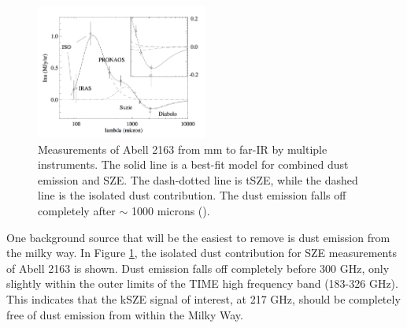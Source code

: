 \documentclass[manuscript]{aastex}
\begin{document}
\begin{figure}
\vspace{-0.8cm}
  \begin{center}
    \includegraphics[width=0.5\textwidth]{birkinshaw1.png}
   \end{center}
\caption[TIME's frequency window will be mostly free of dust emission contamination. -(\cite{Birkinshaw1999})]{Measurements of Abell 2163 from mm to far-IR by multiple instruments. The solid line is a best-fit model for combined dust emission and SZE. The dash-dotted line is tSZE, while the dashed line is the isolated dust contribution. The dust emission falls off completely after $\sim$ 1000 microns (\cite{Birkinshaw1999}).}
\label{fig:dust}
\end{figure}
One background source that will be the easiest to remove is dust emission from the milky way. In Figure \ref{fig:dust}, the isolated dust contribution for SZE measurements of Abell 2163 is shown. Dust emission falls off completely before 300 GHz, only slightly within the outer limits of the TIME high frequency band (183-326 GHz). This indicates that the kSZE signal of interest, at 217 GHz, should be completely free of dust emission from within the Milky Way. 
\end{document}
